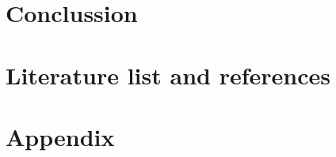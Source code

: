 \documentclass[12pt]{article} %
\begin{document}
\section{Conclussion}
\section{Literature list and references}
\section{Appendix}




\newpage
\appendix
\label{appendix}
\end{document}

